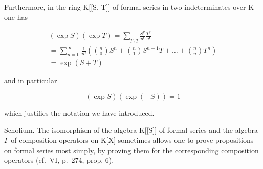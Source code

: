 Furthermore, in the ring K{[}{[}S, T{]}{]} of formal series in two indeterminates over K one has

\[
\begin{array}{l} (\exp S) (\exp T) = \sum_ {p, q} \frac {S ^ {p}}{p !} \frac {T ^ {q}}{q !} \\ = \sum_ {n = 0} ^ {\infty} \frac {1}{n !} \left(\binom {n} {0} S ^ {n} + \binom {n} {1} S ^ {n - 1} T + \dots + \binom {n} {n} T ^ {n}\right) \\ = \exp (S + T) \end{array}\tag{4}
\]

and in particular

\[
(\exp S) (\exp (- S)) = 1\tag{5}
\]

which justifies the notation we have introduced.

Scholium. The isomorphism of the algebra K{[}{[}S{]}{]} of formal series and the algebra \(\Gamma\) of composition operators on K{[}X{]} sometimes allows one to prove propositions on formal series most simply, by proving them for the corresponding composition operators (cf.~VI, p.~274, prop. 6).


